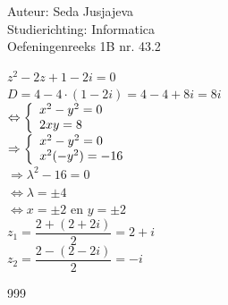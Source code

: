 \documentclass[a4paper]{article}
\begin{document}
\noindent \large Auteur: Seda Jusjajeva\\
\noindent \large Studierichting: Informatica\\
\noindent \large Oefeningenreeks 1B nr. 43.2\\

\medskip

\normalsize

$z^2 - 2z + 1 - 2i = 0$ \\

$D = 4 - 4 \cdot (1 - 2i) = 4 - 4 + 8i = 8i$ \\

$\Leftrightarrow \left \{ \\
\begin{array}{l}
    x^2 - y^2 = 0 \\
    2xy = 8 \\
\end{array} \\
\right . $\\

$\Rightarrow \left \{ \\
\begin{array}{l}
    x^2 - y^2 = 0 \\
    x^2 (-y^2) = -16 \\
\end{array} \\
\right . $\\


$\Rightarrow \lambda^2 - 16 = 0 $\\

$\Leftrightarrow \lambda = \pm 4$\\

$\Leftrightarrow x = \pm 2$ en $y = \pm 2$\\

$ z_1 = \dfrac{2 + (2 + 2i)}{2} = 2+i $\\

$ z_2 = \dfrac{2 - (2 - 2i)}{2} = -i $\\



\begin{thebibliography}{999}
\end{thebibliography}
\end{document}
